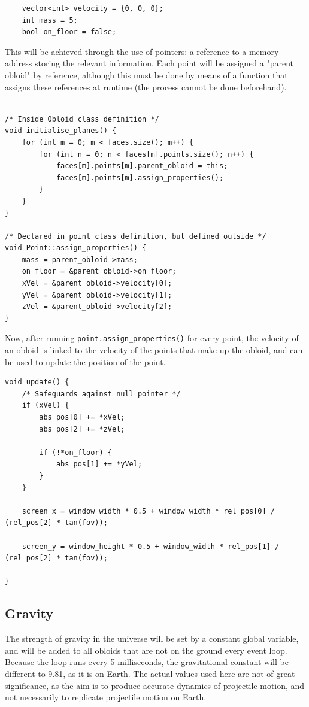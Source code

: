 \documentclass{article}
\begin{document}
\begin{lstlisting}
	vector<int> velocity = {0, 0, 0};
	int mass = 5;
	bool on_floor = false;
\end{lstlisting}
This will be achieved through the use of pointers: a reference to a memory address storing the relevant information. Each point will be assigned a "parent obloid" by reference, although this must be done by means of a function that assigns these references at runtime (the process cannot be done beforehand).

\begin{lstlisting}

/* Inside Obloid class definition */
void initialise_planes() {
	for (int m = 0; m < faces.size(); m++) {
		for (int n = 0; n < faces[m].points.size(); n++) {
			faces[m].points[m].parent_obloid = this;
			faces[m].points[m].assign_properties();
		}
	}
}

/* Declared in point class definition, but defined outside */
void Point::assign_properties() {
	mass = parent_obloid->mass;
	on_floor = &parent_obloid->on_floor;
	xVel = &parent_obloid->velocity[0];
	yVel = &parent_obloid->velocity[1];
	zVel = &parent_obloid->velocity[2];
}
\end{lstlisting}
Now, after running \verb|point.assign_properties()| for every point, the velocity of an obloid is linked to the velocity of the points that make up the obloid, and can be used to update the position of the point.
\newline
\newline
\newline
\begin{lstlisting}
void update() {
	/* Safeguards against null pointer */
	if (xVel) {
		abs_pos[0] += *xVel;
		abs_pos[2] += *zVel;

		if (!*on_floor) {
			abs_pos[1] += *yVel;
		}
	}

	screen_x = window_width * 0.5 + window_width * rel_pos[0] / (rel_pos[2] * tan(fov));

	screen_y = window_height * 0.5 + window_width * rel_pos[1] / (rel_pos[2] * tan(fov));	

}
\end{lstlisting}
\subsection{Gravity}
The strength of gravity in the universe will be set by a constant global variable, and will be added to all obloids that are not on the ground every event loop. Because the loop runs every 5 milliseconds, the gravitational constant will be different to 9.81, as it is on Earth. 
\newline
\newline
The actual values used here are not of great significance, as the aim is to produce accurate dynamics of projectile motion, and not necessarily to replicate projectile motion on Earth.
\end{document}
